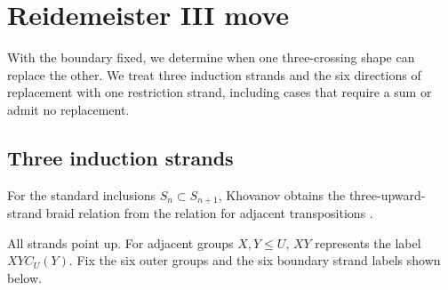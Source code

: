 \documentclass[11pt,a4paper]{article}
\numberwithin{equation}{section}
\theoremstyle{definition}
\begin{document}
\section{Reidemeister III move}\label{sec:reidemeister-three}

With the boundary fixed, we determine when one three-crossing shape
can replace the other. We treat three induction strands and the six
directions of replacement with one restriction strand, including
cases that require a sum or admit no replacement.

\subsection{Three induction strands}

For the standard inclusions \(S_n\subset S_{n+1}\), Khovanov obtains
the three-upward-strand braid relation from the relation for adjacent
transpositions \cite[Prop.~7]{khovanov}.

All strands point up. For adjacent groups \(X,Y\le U\),
\(\boxed{XY}\) represents the label \(\boxed{XY}C_U(Y)\).
Fix the six outer groups and the six boundary strand labels shown
below.
\end{document}
